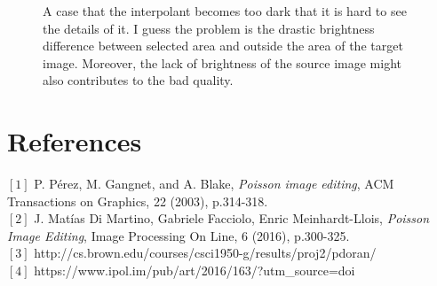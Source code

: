 \documentclass[11pt]{article}
\begin{document}
\begin{figure}[H]
		\caption{A case that the interpolant becomes too dark that it is hard to see the details of it. I guess the problem is the drastic brightness difference between selected area and outside the area of the target image. Moreover, the lack of brightness of the source image might also contributes to the bad quality.}
	\end{figure}
	

\section{References}
	
	$\left[1\right]$ P. P\'erez, M. Gangnet, and A. Blake, \textit{Poisson image editing}, ACM Transactions on Graphics, 22 (2003), p.314-318.
	~\\
	$\left[2\right]$ J. Mat\'ias Di Martino, Gabriele Facciolo, Enric Meinhardt-Llois, \textit{Poisson Image Editing}, Image Processing On Line, 6 (2016), p.300-325.
	~\\
	$\left[3\right]$ http://cs.brown.edu/courses/csci1950-g/results/proj2/pdoran/
	~\\
	$\left[4\right]$ https://www.ipol.im/pub/art/2016/163/?utm\_source=doi
\end{document}
